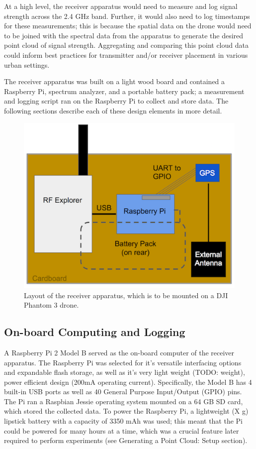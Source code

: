 \documentclass[pageno]{jpaper}
\begin{document}
At a high level, the receiver apparatus would need to measure and log signal strength across the 2.4 GHz band. Further, it would also need to log timestamps for these measurements; this is because the spatial data on the drone would need to be joined with the spectral data from the apparatus to generate the desired point cloud of signal strength. Aggregating and comparing this point cloud data could inform best practices for transmitter and/or receiver placement in various urban settings.

The receiver apparatus was built on a light wood board and contained a Raspberry Pi, spectrum analyzer, and a portable battery pack; a measurement and logging script ran on the Raspberry Pi to collect and store data. The following sections describe each of these design elements in more detail.

\begin{figure}[h]
	\caption{Layout of the receiver apparatus, which is to be mounted on a DJI Phantom 3 drone.}
	\includegraphics{apparatus}
	\centering
\end{figure}

\subsection{On-board Computing and Logging}
A Raspberry Pi 2 Model B served as the on-board computer of the receiver apparatus. The Raspberry Pi was selected for it's versatile interfacing options and expandable flash storage, as well as it's very light weight (TODO: weight), power efficient design (200mA operating current). Specifically, the Model B has 4 built-in USB ports as well as 40 General Purpose Input/Output (GPIO) pins. The Pi ran a Raspbian Jessie operating system mounted on a 64 GB SD card, which stored the collected data. To power the Raspberry Pi, a lightweight (X g) lipstick battery with a capacity of 3350 mAh was used; this meant that the Pi could be powered for many hours at a time, which was a crucial feature later required to perform experiments (see Generating a Point Cloud: Setup section). 
\end{document}
